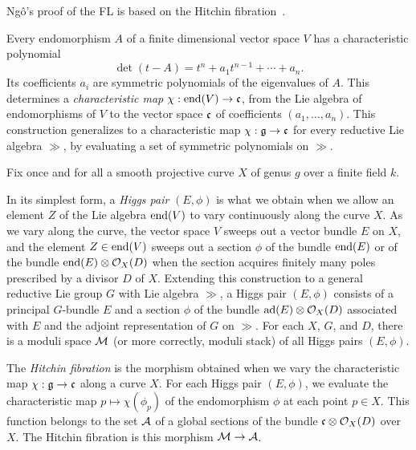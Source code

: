 Ng\^o's proof of the FL is based on the Hitchin fibration~\cite{Hitchin:87}.

Every endomorphism $A$
of a finite dimensional vector space $V$ has a characteristic polynomial
\begin{equation}
\det(t - A) = t^n + a_1 t^{n-1} + \cdots +a_n.
\end{equation}
Its coefficients $a_i$ are symmetric polynomials of the eigenvalues of
$A$.  This determines a {\it characteristic map} $\chi:\op{end}(V) \to
\cc$, from the Lie algebra of endomorphisms of $V$ to the vector space
$\cc$ of coefficients $(a_1,\ldots,a_n)$.  This construction
generalizes to a characteristic map $\chi:\gg\to \cc$ for every
reductive Lie algebra $\gg$, by evaluating a set of symmetric
polynomials on $\gg$.

Fix once and for all a smooth projective
curve $X$ of genus $g$ over a finite field $k$.  

In its simplest form, a {\it Higgs pair} $(E,\phi)$
is what we obtain when we allow an element $Z$ of the Lie
algebra $\op{end}(V)$ to vary continuously along the curve $X$.  
As we vary along the curve, the vector space $V$ sweeps out a vector
bundle $E$ on $X$, and the element $Z\in\op{end}(V)$ sweeps out a
section $\phi$ of the bundle $\op{end}(E)$ or of the bundle
$\op{end}(E)\otimes {\OO}_X(D)$ when the section acquires finitely
many poles prescribed by a divisor $D$ of $X$.  Extending this
construction to a general reductive Lie group $G$ with Lie algebra
$\gg$, a Higgs pair $(E,\phi)$ consists of a principal $G$-bundle $E$
and a section $\phi$ of the bundle $\op{ad}(E)\otimes {\OO}_X(D)$
associated with $E$ and the adjoint representation of $G$ on $\gg$.
For each $X$, $G$, and $D$, there is a moduli space ${\MM}$ (or more
correctly, moduli stack) of all Higgs pairs $(E,\phi)$.

The {\it Hitchin fibration} is the morphism obtained when we vary the
characteristic map $\chi:\gg\to \cc$  along a
curve $X$.  For each Higgs pair $(E,\phi)$, we evaluate the
characteristic map $p\mapsto \chi(\phi_p)$ of the endomorphism $\phi$
at each point $p\in X$. This function belongs to the set $\AA$ of a
global sections of the bundle $\cc\otimes {\OO}_X(D)$ over $X$.  The
Hitchin fibration is this morphism ${\MM}\to {\AA}$.

